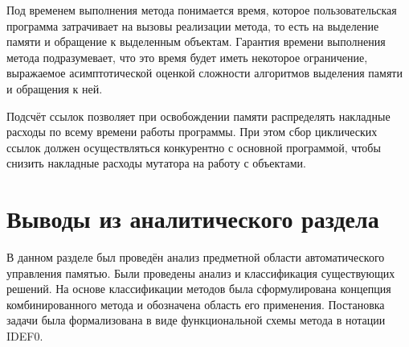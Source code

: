 Под временем выполнения метода понимается время, которое пользовательская программа затрачивает на вызовы реализации метода, то есть на выделение памяти и обращение к выделенным объектам. Гарантия времени выполнения метода подразумевает, что это время будет иметь некоторое ограничение, выражаемое асимптотической оценкой сложности алгоритмов выделения памяти и обращения к ней.

Подсчёт ссылок позволяет при освобождении памяти распределять накладные расходы по всему времени работы программы. При этом сбор циклических ссылок должен осуществляться конкурентно с основной программой, чтобы снизить накладные расходы мутатора на работу с объектами.



\section*{Выводы из аналитического раздела}

В данном разделе был проведён анализ предметной области автоматического управления памятью. Были проведены анализ и классификация существующих решений. На основе классификации методов была сформулирована концепция комбинированного метода и обозначена область его применения. Постановка задачи была формализована в виде функциональной схемы метода в нотации IDEF0.

